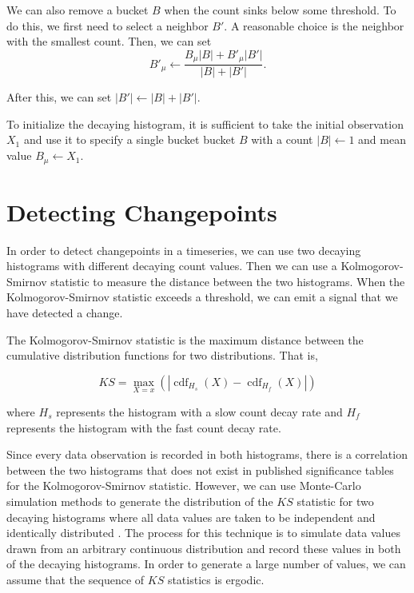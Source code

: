 \documentclass{sigkddExp}
\DeclareMathOperator{\cdf}{cdf}
\begin{document}
    We can also remove a bucket $B$ when the count sinks below some threshold.
    To do this, we first need to select a neighbor $B'$. A reasonable choice is
    the neighbor with the smallest count. Then, we can set
    \begin{displaymath}
        B'_{\mu} \leftarrow \frac{B_{\mu} |B| + B'_{\mu} |B'|}{|B| + |B'|}.
    \end{displaymath}

    After this, we can set $|B'| \leftarrow |B| + |B'|$.

    To initialize the decaying histogram, it is sufficient to take the initial
    observation $X_1$ and use it to specify a single bucket
    bucket $B$ with a count $|B| \leftarrow 1$ and mean value $B_{\mu}
    \leftarrow X_1$.

\section{Detecting Changepoints}
    In order to detect changepoints in a timeseries, we can use two decaying
    histograms with different decaying count values. Then we can use a
    Kolmogorov-Smirnov statistic to measure the distance between the two
    histograms. When the Kolmogorov-Smirnov statistic exceeds a threshold, we
    can emit a signal that we have detected a change.

    The Kolmogorov-Smirnov statistic is the maximum distance between the
    cumulative distribution functions for two distributions. That is,

    \begin{displaymath}
        KS = \max_{X = x}(|\cdf_{H_s}(X) - \cdf_{H_f}(X)|)
    \end{displaymath}

    where $H_s$ represents the histogram with a slow count decay rate and
    $H_f$ represents the histogram with the fast count decay rate.

    Since every data observation is recorded in both histograms, there is a
    correlation between the two histograms that does not exist in published
    significance tables for the Kolmogorov-Smirnov statistic. However, we can
    use Monte-Carlo simulation methods to generate the distribution of the $KS$
    statistic for two decaying histograms where all data values are taken to be
    independent and identically distributed \cite{robert2005monte}. The process
    for this technique is to simulate data values drawn from an arbitrary
    continuous distribution and record these values in both of the decaying
    histograms. In order to generate a large number of values, we can assume
    that the sequence of $KS$ statistics is ergodic.
\end{document}
